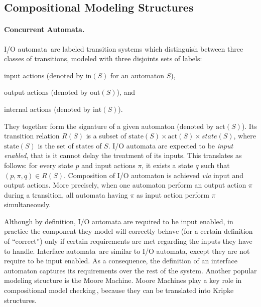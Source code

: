 \subsection{Compositional Modeling Structures}
\label{subsec:sota:compmod}

\paragraph{Concurrent Automata.}
%
I/O automata\,\cite{lynch1988ioautomata} are labeled transition systems which
distinguish between three classes of transitions, modeled with three disjoints
sets of labels:
%
\begin{inparaenum}[(1)]
\item input actions (denoted by \( \mathrm{in}(S) \) for an automaton \( S \)),
\item output actions (denoted by \( \mathrm{out}(S) \)), and
\item internal actions (denoted by \( \mathrm{int}(S) \)).
\end{inparaenum}
%
They together form the signature of a given automaton (denoted by
\( \mathrm{act}(S) \)).
%
Its transition relation \( R(S) \) is a subset of
\( \mathrm{state}(S) \times \mathrm{act}(S) \times state(S) \), where
\( \mathrm{state}(S) \) is the set of states of \( S \).
%
I/O automata are expected to be \emph{input enabled}, that is it cannot delay
the treatment of its inputs.
%
This translates as follows: for every state \( p \) and input actions \( \pi \),
it exists a state \( q \) such that \( (p, \pi, q) \in R(S) \).
%
Composition of I/O automaton is achieved \emph{via} input and output actions.
%
More precisely, when one automaton perform an output action \( \pi \) during a
transition, all automata having \( \pi \) as input action perform \( \pi \)
simultaneously.

Although by definition, I/O automata are required to be input enabled, in
practice the component they model will correctly behave (for a certain
definition of ``correct'') only if certain requirements are met regarding the
inputs they have to handle.
%
Interface automata\,\cite{de2001interfaceautomata} are similar to I/O automata,
except they are not require to be input enabled.
%
As a consequence, the definition of an interface automaton captures its
requirements over the rest of the system.
%
Another popular modeling structure is the Moore Machine.
%
Moore Machines play a key role in compositional model
checking\,\cite{mcmillan1989compositional}, because they can be translated into
Kripke structures.


